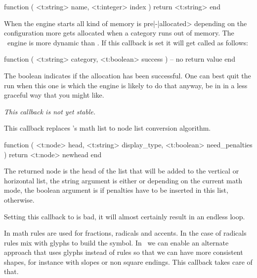 \starttyping[option=LUA]
function (
    <t:string>  name,
    <t:integer> index
)
    return <t:string>
end
\stoptyping

\stopsubsection

\startsubsection[title=trace_memory]

When the engine starts all kind of memory is pre|-|allocated> depending on the
configuration more gets allocated when a category runs out of memory. The
\LUAMETATEX\ engine is more dynamic than \LUATEX. If this callback is set it will
get called as follows:

\starttyping[option=LUA]
function (
    <t:string>  category,
    <t:boolean> success
)
    -- no return value
end
\stoptyping

The boolean indicates if the allocation has been successful. One can best quit
the run when this one is  which the engine is likely to do that
anyway, be in in a less graceful way that you might like.

\stopsubsection

\startsubsection[title=paragraph_pass]

{\em This callback is not yet stable.}

\stopsubsection

\stopsection

\startsection[title=Math]

\startsubsection[title=mlist_to_hlist]

This callback replaces \LUATEX's math list to node list conversion algorithm.

\starttyping[option=LUA]
function (
    <t:node>    head,
    <t:string>  display_type,
    <t:boolean> need_penalties
)
    return <t:node> newhead
end
\stoptyping

The returned node is the head of the list that will be added to the vertical or
horizontal list, the string argument is either  or 
depending on the current math mode, the boolean argument is  if
penalties have to be inserted in this list,  otherwise.

Setting this callback to  is bad, it will almost certainly result in
an endless loop.

\stopsubsection

\startsubsection[title=math_rule]

In math rules are used for fractions, radicals and accents. In the case of
radicals rules mix with glyphs to build the symbol. In \CONTEXT\ we can enable an
alternate approach that uses glyphs instead of rules so that we can have more
consistent shapes, for instance with slopes or non square endings. This callback
takes care of that.

